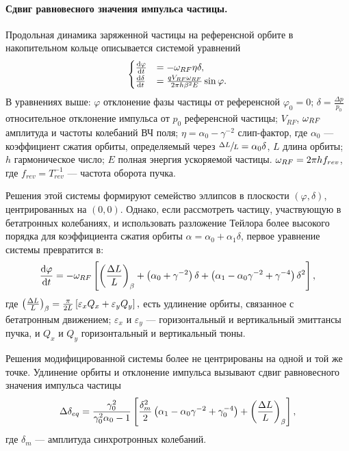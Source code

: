 \paragraph{Сдвиг равновесного значения импульса частицы.}
Продольная динамика заряженной частицы на референсной орбите в
накопительном кольце описывается системой уравнений
\begin{equation*}
	\begin{cases}
		\frac{\mathrm{d} {\varphi}}{\mathrm{d} t} &= -\omega_{RF}\eta\delta, \\
		\frac{\mathrm{d} {\delta}}{\mathrm{d} t} &= \frac{q V_{RF}\omega_{RF}}{2\pi h\beta^2E}\sin\varphi.
	\end{cases}
\end{equation*}
В уравнениях выше: $\varphi$ отклонение фазы частицы от референсной
$\varphi_0 = 0$; $\delta = \frac{\Delta p}{p_0}$ относительное
отклонение импульса от $p_0$ референсной частицы; $V_{RF}$, $\omega_{RF}$
амплитуда и частоты колебаний ВЧ поля; $\eta = \alpha_0 - \gamma^{-2}$
слип-фактор, где $\alpha_0$ --- коэффициент сжатия орбиты, определяемый
через $\sfrac{\Delta L}{L} = \alpha_0\delta$, $L$ длина орбиты; $h$
гармоническое число; $E$ полная энергия ускоряемой частицы. $\omega_{RF} =
2\pi h f_{rev}$, где $f_{rev}=T_{rev}^{-1}$ --- частота оборота пучка.

Решения этой системы формируют семейство эллипсов в плоскости
$(\varphi, \delta)$, центрированных на $(0,0)$. Однако, если
рассмотреть частицу, участвующую в бетатронных колебаниях, и
использовать разложение Тейлора более высокого порядка для
коэффициента сжатия орбиты $\alpha = \alpha_0 + \alpha_1\delta$,
первое уравнение системы превратится в:~\cite[стр.~2579]{Senichev:IPAC13}
\[
\ddt{\varphi} = -\w_{RF} \bkt*{\bkt{\frac{\Delta L}{L}}_\beta + \bkt{\alpha_0 + \gamma^{-2}}\delta + \bkt{\alpha_1 - \alpha_0\gamma^{-2} + \gamma^{-4}}\delta^2},
\]
где $\bkt{\frac{\Delta L}{L}}_\beta =
\frac{\pi}{2L}\bkt*{\varepsilon_xQ_x + \varepsilon_yQ_y},$ есть
удлинение орбиты, связанное с бетатронным движением; $\varepsilon_x$ и
$\varepsilon_y$ --- горизонтальный и вертикальный эмиттансы пучка, и
$Q_x$ и $Q_y$ горизонтальный и вертикальный тюны.~\cite[стр.~2580]{Senichev:IPAC13}

Решения модифицированной системы более не центрированы на одной и той
же точке. Удлинение орбиты и отклонение импульса вызывают сдвиг
равновесного значения импульса частицы~\cite[стр.~2581]{Senichev:IPAC13}
\begin{equation}\label{eq:EquLevMom_shift}
\Delta\delta_{eq} = \frac{\gamma_0^2}{\gamma_0^2\alpha_0 - 1}\bkt*{\frac{\delta_m^2}{2}\bkt{\alpha_1 - \alpha_0\gamma^{-2} + \gamma_0^{-4}} + \bkt{\frac{\Delta L}{L}}_\beta},
\end{equation}
где $\delta_m$ --- амплитуда синхротронных колебаний.

